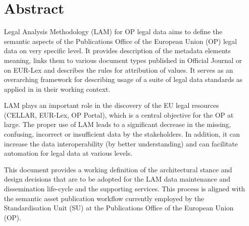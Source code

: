\section*{Abstract}

	Legal Analysis Methodology (LAM) for OP legal data aims to define the semantic aspects of the Publications Office of the European Union (OP) legal data on very specific level. It provides description of the metadata elements meaning, links them to various document types published in Official Journal or on EUR-Lex and describes the rules for attribution of values. It serves as an overarching framework for describing usage of a suite of legal data standards as applied in in their working context. 
	
	LAM plays an important role in the discovery of the EU legal resources (CELLAR, EUR-Lex, OP Portal), which is a central objective for the OP at large. The proper use of LAM leads to a significant decrease in the missing, confusing, incorrect or insufficient data by the stakeholders. In addition, it can increase the data interoperability (by better understanding) and can facilitate automation for legal data at various levels.

    This document provides a working definition of the architectural stance and design decisions that are to be adopted for the LAM data maintenance and dissemination life-cycle and the supporting services. This process is aligned with the semantic asset publication workflow currently employed by the Standardisation Unit (SU) at the Publications Office of the European Union (OP).